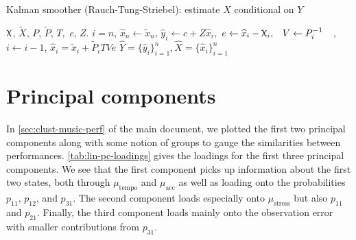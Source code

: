 \documentclass[aoas]{imsart}
\renewcommand{\hat}{\widehat}
\DeclareRobustCommand{\varx}{{\mathpalette\irchi\relax}}
\newcommand{\irchi}[2]{\protect\raisebox{\depth}{$#1\upchi$}}
\begin{document}
\begin{algorithm}
  \caption{Kalman smoother (Rauch-Tung-Striebel): estimate $\hat{X}$ conditional on
    $Y$\label{alg:kalman-smoother}} 
  \begin{algorithmic}
     $\varx$, $\widetilde{X}$, $P$, $\widetilde{P}$,
    $T,$ $c$, $Z$.
    \STATE $i=n$,
    \STATE $\hat{x}_{n}\leftarrow \widetilde{x}_n$, 
    \STATE $\hat{y}_i \leftarrow c + Z\hat{x}_i,$
    \STATE $\begin{aligned} e &\leftarrow \hat{x}_i -
      \varx_i, & V &\leftarrow P_i^{-1}\end{aligned}$,
    \STATE $i\leftarrow i-1$, 
    \STATE $\hat{x}_i = \widetilde{x}_i + \widetilde{P}_i T Ve $ 
    \ENDWHILE
    \RETURN $\widehat{Y}=\{\hat{y}_i\}_{i=1}^n, \hat{X}=\{\hat{x}_i\}_{i=1}^n$
  \end{algorithmic}
\end{algorithm}

\hypertarget{principal-components}{%
\section{Principal components}\label{principal-components}}

In \autoref{sec:clust-music-perf} of the main document, we plotted the
first two principal components along with some notion of groups to gauge
the similarities between performances. \autoref{tab:lin-pc-loadings}
gives the loadings for the first three principal components. We see that
the first component picks up information about the first two states,
both through \(\mu_{\textrm{tempo}}\) and \(\mu_{\textrm{acc}}\) as well
as loading onto the probabilities \(p_{11}\), \(p_{12}\), and
\(p_{31}\). The second component loads especially onto
\(\mu_{\textrm{stress}}\) but also \(p_{11}\) and \(p_{21}\). Finally,
the third component loads mainly onto the observation error with smaller
contributions from \(p_{31}\).

\begin{table}

\caption{\label{tab:lin-pc-loadings}The factor loadings for principal component analysis of the parameter estimates.}
\centering
{}
\end{table}
\end{document}
